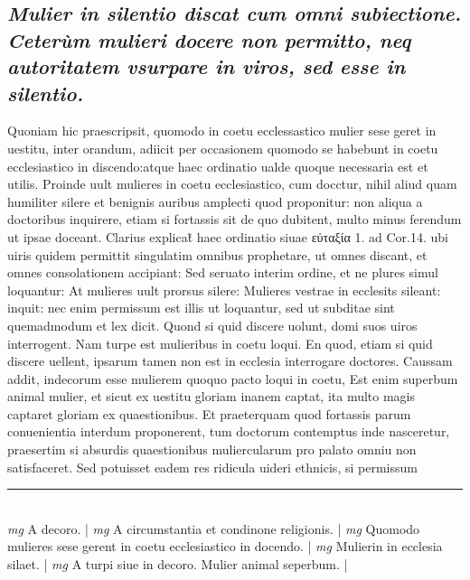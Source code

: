 \documentclass{article}
\begin{document}
\begin{pages}
\subsection*{\textit{Mulier in silentio discat cum omni subiectione. Ceterùm mulieri docere non permitto, neq autoritatem vsurpare in viros, sed esse in silentio. }}\pstart Quoniam hic praescripsit, quomodo in coetu ecclessastico mulier sese geret in uestitu, inter orandum, adiicit per occasionem quomodo se habebunt in coetu ecclesiastico in discendo:atque haec ordinatio ualde quoque necessaria est et utilis. Proinde uult mulieres in coetu ecclesiastico, cum docctur, nihil aliud quam humiliter silere et benignis auribus amplecti quod proponitur: non aliqua a doctoribus inquirere, etiam si fortassis sit de quo dubitent, multo minus ferendum ut ipsae doceant. Clarius explicat̃ haec ordinatio siuae εὐταξία 1. ad Cor.14. ubi uiris quidem permittit singulatim omnibus prophetare, ut omnes discant, et omnes consolationem accipiant: Sed seruato interim ordine, et ne plures simul loquantur: At mulieres uult prorsus silere: Mulieres vestrae in ecclesits sileant: inquit: nec enim permissum est illis ut loquantur, sed ut subditae sint quemadmodum et lex dicit. Quond si quid discere uolunt, domi suos uiros interrogent. Nam turpe est mulieribus in coetu loqui. En quod, etiam si quid discere uellent, ipsarum tamen non est in ecclesia interrogare doctores. Caussam addit, indecorum esse mulierem quoquo pacto loqui in coetu, Est enim superbum animal mulier, et sicut ex uestitu gloriam inanem captat, ita multo magis captaret gloriam ex quaestionibus. Et praeterquam quod fortassis parum conuenientia interdum proponerent, tum doctorum contemptus inde nasceretur, praesertim si absurdis quaestionibus muliercularum pro palato omniu non satisfaceret. Sed potuisset eadem res ridicula uideri ethnicis, si permissum  \pend
\vspace{0.5cm}\noindent
\vspace{0.2cm}\rule{1cm}{0.2pt}\\ 
\hspace{0.2cm}\textit{mg}
\footnotesize A decoro. 
\normalsize| 
\hspace{0.2cm}\textit{mg}
\footnotesize A circumstantia et condinone religionis. 
\normalsize| 
\hspace{0.2cm}\textit{mg}
\footnotesize Quomodo mulieres sese gerent in coetu ecclesiastico in docendo. 
\normalsize| 
\hspace{0.2cm}\textit{mg}
\footnotesize Mulierin in ecclesia silaet. 
\normalsize| 
\hspace{0.2cm}\textit{mg}
\footnotesize A turpi siue in decoro. Mulier animal seperbum. 
\normalsize| 

\end{pages}
\end{document}
